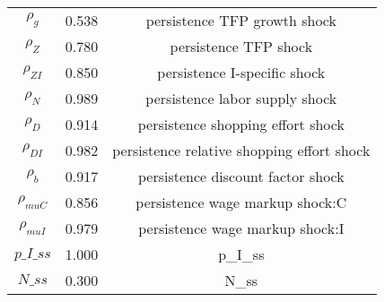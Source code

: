 \begin{center}
\begin{longtable}{ccc}
${\rho_g}$ 	 & 	 0.538 	 & 	 persistence TFP growth shock\\
${\rho_Z}$ 	 & 	 0.780 	 & 	 persistence TFP shock\\
${\rho_{ZI}}$ 	 & 	 0.850 	 & 	 persistence I-specific shock\\
${\rho_N}$ 	 & 	 0.989 	 & 	 persistence labor supply shock\\
${\rho_D}$ 	 & 	 0.914 	 & 	 persistence shopping effort shock\\
${\rho_{DI}}$ 	 & 	 0.982 	 & 	 persistence relative shopping effort shock\\
${\rho_b}$ 	 & 	 0.917 	 & 	 persistence discount factor shock\\
${\rho_{muC}}$ 	 & 	 0.856 	 & 	 persistence wage markup shock:C\\
${\rho_{muI}}$ 	 & 	 0.979 	 & 	 persistence wage markup shock:I\\
$p\_I\_ss$ 	 & 	 1.000 	 & 	 p\_I\_ss\\
$N\_ss$ 	 & 	 0.300 	 & 	 N\_ss\\
\bottomrule%
\end{longtable}
\end{center}
